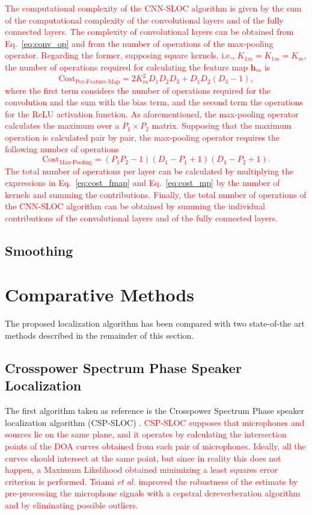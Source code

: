 \documentclass[review]{elsarticle}
\let\originaleqref=\eqref
\renewcommand{\eqref}{Eq.~\originaleqref}
\begin{document}
\textcolor{red}{The computational complexity of the CNN-SLOC algorithm is given by the sum of the computational complexity of the convolutional layers and of the fully connected layers. The complexity of convolutional layers can be obtained from \eqref{eq:conv_op} and from the number of operations of the max-pooling operator. Regarding the former, supposing square kernels, i.e., $K_{1m} = K_{1m} = K_m$, the number of operations required for calculating the feature map $\mathbf{h}_{m}$ is
\begin{equation}\label{eq:cost_fmap}
\text{Cost}_{\text{Per-Feature-Map}} =2K_m^2D_1D_2D_3+D_1D_2(D_3-1),
\end{equation}
where the first term considers the number of operations required for the convolution and the sum with the bias term, and the second term the operations for the ReLU activation function. As aforementioned, the max-pooling operator calculates the maximum over a $P_1 \times P_2 $ matrix. Supposing that the maximum operation is calculated pair by pair, the max-pooling operator requires the following number of operations
\begin{equation}\label{eq:cost_mp}
\text{Cost}_{\text{Max-Pooling}}=(P_1P_2-1)(D_1-P_1+1)(D_1-P_2+1).
\end{equation}
The total number of operations per layer can be calculated by multiplying the expressions in \eqref{eq:cost_fmap} and \eqref{eq:cost_mp} by the number of kernels and summing the contributions. Finally, the total number of operations of the CNN-SLOC algorithm can be obtained by summing the individual contributions of the convolutional layers and of the fully connected layers.}

\subsection{Smoothing}

\section{Comparative Methods}
\label{sec:comp_meth}
The proposed localization algorithm has been compared with two state-of-the art methods described in the remainder of this section.

\subsection{Crosspower Spectrum Phase Speaker Localization}\label{sec:soa_met}
The first algorithm taken as reference is the Crosspower Spectrum Phase speaker localization algorithm (CSP-SLOC) \cite{tsiami2014experiments}. \textcolor{red}{CSP-SLOC supposes that microphones and sources lie on the same plane, and it operates by calculating the intersection points of the DOA curves obtained from each pair of microphones. Ideally, all the curves should intersect at the same point, but since in reality this does not happen, a Maximum Likelihood obtained minimizing a least squares error criterion is performed. Tsiami \textit{et al.} \cite{tsiami2014experiments} improved the robustness of the estimate by pre-processing the microphone signals with a cepstral dereverberation algorithm  and by eliminating possible outliers.}
\end{document}

